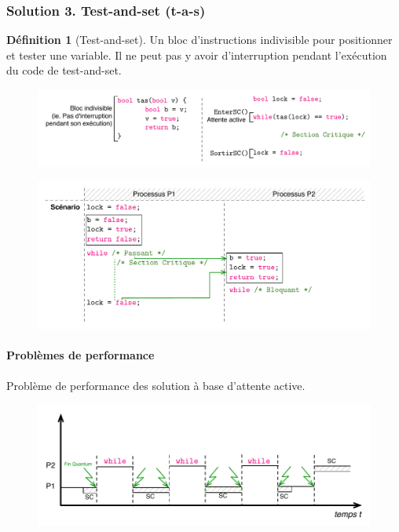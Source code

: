 \documentclass[11pt,english,french]{scrreprt}
\theoremstyle{remark}
\theoremstyle{definition}
\newtheorem*{def*}{Définition}
\begin{document}
\subsubsection{Solution 3. Test-and-set (t-a-s)}
\begin{def*}[Test-and-set]
	Un bloc d'instructions indivisible pour positionner et tester une variable. Il ne peut pas y avoir d'interruption pendant l'exécution du code de test-and-set.
\end{def*}

\begin{figure}[h!]
	\center
	\vspace{-10pt}
	\includegraphics[scale=.85]{img/SC-tas} 
\end{figure}

\begin{figure}[h!]
	\center
	\vspace{-30pt}
	\includegraphics[scale=.85]{img/SC-tas-scenario}   
	\vspace{-30pt}
\end{figure}

\paragraph{Problèmes de performance} %

Problème de performance des solution à base d'attente active.
\begin{figure}[h!]
	\center
	\vspace{-10pt}
	\includegraphics[scale=.85]{img/SC-perf}      
	\vspace{-30pt} 
\end{figure}
\end{document}
